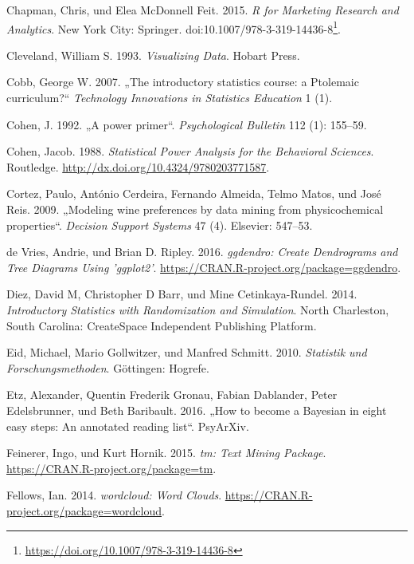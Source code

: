 \documentclass[12pt,ngerman,]{book}
\let\rmarkdownfootnote\footnote%
\def\footnote{\protect\rmarkdownfootnote}
\renewcommand{\href}[2]{#2\footnote{\url{#1}}}
\theoremstyle{definition}
\theoremstyle{definition}
\theoremstyle{remark}
\begin{document}
\hypertarget{ref-Chapman2015}{}
Chapman, Chris, und Elea McDonnell Feit. 2015. \emph{R for Marketing
Research and Analytics}. New York City: Springer.
doi:\href{https://doi.org/10.1007/978-3-319-14436-8}{10.1007/978-3-319-14436-8}.

\hypertarget{ref-Cleveland}{}
Cleveland, William S. 1993. \emph{Visualizing Data}. Hobart Press.

\hypertarget{ref-cobb2007introductory}{}
Cobb, George W. 2007. „The introductory statistics course: a Ptolemaic
curriculum?`` \emph{Technology Innovations in Statistics Education} 1
(1).

\hypertarget{ref-Cohen1992}{}
Cohen, J. 1992. „A power primer``. \emph{Psychological Bulletin} 112
(1): 155--59.

\hypertarget{ref-cohen_statistical_1988}{}
Cohen, Jacob. 1988. \emph{Statistical Power Analysis for the Behavioral
Sciences}. Routledge. \url{http://dx.doi.org/10.4324/9780203771587}.

\hypertarget{ref-cortez2009modeling}{}
Cortez, Paulo, António Cerdeira, Fernando Almeida, Telmo Matos, und José
Reis. 2009. „Modeling wine preferences by data mining from
physicochemical properties``. \emph{Decision Support Systems} 47 (4).
Elsevier: 547--53.

\hypertarget{ref-R-ggdendro}{}
de Vries, Andrie, und Brian D. Ripley. 2016. \emph{ggdendro: Create
Dendrograms and Tree Diagrams Using 'ggplot2'}.
\url{https://CRAN.R-project.org/package=ggdendro}.

\hypertarget{ref-introstats}{}
Diez, David M, Christopher D Barr, und Mine Cetinkaya-Rundel. 2014.
\emph{Introductory Statistics with Randomization and Simulation}. North
Charleston, South Carolina: CreateSpace Independent Publishing Platform.

\hypertarget{ref-eid2010statistik}{}
Eid, Michael, Mario Gollwitzer, und Manfred Schmitt. 2010.
\emph{Statistik und Forschungsmethoden}. Göttingen: Hogrefe.

\hypertarget{ref-etz2016become}{}
Etz, Alexander, Quentin Frederik Gronau, Fabian Dablander, Peter
Edelsbrunner, und Beth Baribault. 2016. „How to become a Bayesian in
eight easy steps: An annotated reading list``. PsyArXiv.

\hypertarget{ref-R-tm}{}
Feinerer, Ingo, und Kurt Hornik. 2015. \emph{tm: Text Mining Package}.
\url{https://CRAN.R-project.org/package=tm}.

\hypertarget{ref-R-wordcloud}{}
Fellows, Ian. 2014. \emph{wordcloud: Word Clouds}.
\url{https://CRAN.R-project.org/package=wordcloud}.
\end{document}

